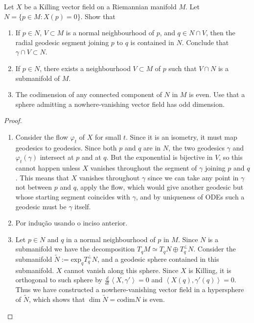 \documentclass{book}
\begin{document}
\begin{exercise}
\label{exercise-singu-killi-vecto-field}
\begin{reference}
\cite[Exercise 12, Chapter VI]{doc}
\end{reference}
Let $X$ be a Killing vector field on a
Riemannian manifold $M$.
Let $N=\{p \in M: X(p)=0\}$. Show that
\begin{enumerate}
\item If $p\in N$, $V \subset M$ is a normal
neighbourhood of $p$,
and $q \in N \cap V$, then the radial
geodesic segment
joining $p$ to $q$ is contained in $N$.
Conclude that $\gamma \cap V\subset N$.

\item If $p \in N$, there exists a
neighbourhood $V \subset M$
of $p$ such that $V \cap N$ is a submanifold
of $M$.

\item The codimension of any connected
component of $N$ in $M$ is even.
Use that a sphere admitting a
nowhere-vanishing vector field
has odd dimension.
\end{enumerate}
\end{exercise}

\begin{proof}
\begin{enumerate}
\item Consider the flow $\varphi_t$ of $X$
for small $t$.
Since it is an isometry, it must map
geodesics to geodesics.
Since both $p$ and $q$ are in $N$, the two
geodesics
$\gamma$ and $\varphi_t(\gamma)$ intersect at
$p$ and at $q$.
But the exponential is bijective in $V$, so
this cannot happen
unless $X$ vanishes throughout the segment of
$\gamma$ joining $p$ and $q$.
This means that $X$ vanishes throughout
$\gamma$ since
we can take any point in $\gamma$ not between
$p$ and $q$,
apply the flow, which would give another
geodesic but
whose starting segment coincides with
$\gamma$,
and by uniqueness of ODEs such a geodesic
must be $\gamma$ itself.

\item Por indução usando o inciso anterior.

\item Let $p \in N$ and $q$ in a normal
neighbourhood of $p$ in $M$.
Since $N$ is a submanifold we have the
decomposition
$T_qM\simeq T_q N\oplus T_q^\perp N$.
Consider the submanifold
$\tilde{N}:=\text{exp}_q T_q^\perp N$,
and a geodesic sphere contained in this
submanifold.
$X$ cannot vanish along this sphere.
Since $X$ is Killing, it is orthogonal to
such sphere
by $\frac{d}{dt}\left\langle{}X,\gamma'\right\rangle{}=0$
and $\left\langle{}X(q),\gamma'(q)\right\rangle{}=0$.
Thus we have constructed a nowhere-vanishing
vector field
in a hypersphere of $\tilde{N}$,
which shows that $\dim \tilde{N}=\text{codim
}N$ is even.
\end{enumerate}
\end{proof}
\end{document}
